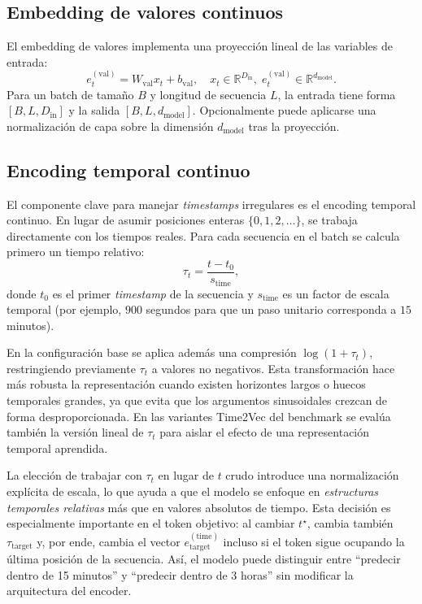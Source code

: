 \subsection{Embedding de valores continuos}
\label{sec:feature-embedding}

El embedding de valores implementa una proyección lineal de las variables de entrada:
\[
    e^{(\text{val})}_t = W_{\text{val}} x_t + b_{\text{val}}, \quad x_t \in \mathbb{R}^{D_{\text{in}}},\; e^{(\text{val})}_t \in \mathbb{R}^{d_{\text{model}}}.
\]
Para un batch de tamaño $B$ y longitud de secuencia $L$, la entrada tiene forma $[B, L, D_{\text{in}}]$ y la salida $[B, L, d_{\text{model}}]$. Opcionalmente puede aplicarse una normalización de capa sobre la dimensión $d_{\text{model}}$ tras la proyección.

\subsection{Encoding temporal continuo}
\label{sec:time-encoding}

El componente clave para manejar \emph{timestamps} irregulares es el encoding temporal continuo. En lugar de asumir posiciones enteras $\{0,1,2,\dots\}$, se trabaja directamente con los tiempos reales. Para cada secuencia en el batch se calcula primero un tiempo relativo:
\[
    \tau_t = \frac{t - t_0}{s_{\text{time}}},
\]
donde $t_0$ es el primer \emph{timestamp} de la secuencia y $s_{\text{time}}$ es un factor de escala temporal (por ejemplo, $900$ segundos para que un paso unitario corresponda a $15$ minutos).

En la configuración base se aplica además una compresión $\log(1+\tau_t)$, restringiendo previamente $\tau_t$ a valores no negativos. Esta transformación hace más robusta la representación cuando existen horizontes largos o huecos temporales grandes, ya que evita que los argumentos sinusoidales crezcan de forma desproporcionada. En las variantes Time2Vec del benchmark se evalúa también la versión lineal de $\tau_t$ para aislar el efecto de una representación temporal aprendida.

\hfill

La elección de trabajar con $\tau_t$ en lugar de $t$ crudo introduce una normalización explícita de escala, lo que ayuda a que el modelo se enfoque en \emph{estructuras temporales relativas} más que en valores absolutos de tiempo. Esta decisión es especialmente importante en el token objetivo: al cambiar $t^\star$, cambia también $\tau_{\text{target}}$ y, por ende, cambia el vector $e^{(\text{time})}_{\text{target}}$ incluso si el token sigue ocupando la última posición de la secuencia. Así, el modelo puede distinguir entre ``predecir dentro de 15 minutos'' y ``predecir dentro de 3 horas'' sin modificar la arquitectura del encoder.

